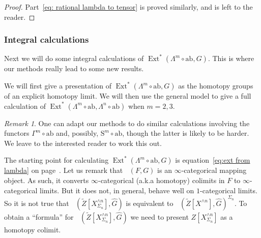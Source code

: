 \documentclass[psamsfonts]{amsart}
\theoremstyle{plain}
\theoremstyle{definition}
\theoremstyle{remark}
\newtheorem{rem}[thm]{Remark}
\newcommand{\abelianization}{\mathrm{ab}}
\newcommand{\symm}{\mathrm{S}}
\DeclareMathOperator{\ext}{Ext}
\DeclareMathOperator{\nat}{Nat}
\DeclareMathOperator{\spectralNat}{\underline{\underline{\nat}}}
\begin{document}
\begin{proof}
Part~\eqref{eq: rational lambda to tensor} is proved similarly, and is left to the reader.
\end{proof}
\subsubsection*{Integral calculations} Next we will do some integral calculations of $\ext^*(\Lambda^m \circ \abelianization, G)$. This is where our methods really lead to some new results. 

We will first give a presentation of $\ext^*(\Lambda^m \circ \abelianization, G)$ as the homotopy groups of an explicit homotopy limit. We will then use the general model to give a full calculation of $\ext^*(\Lambda^m \circ \abelianization, \Lambda^n\circ \abelianization)$ when $m=2,3$.  
\begin{rem}
One can adapt our methods to do similar calculations involving the functors $\Gamma^m\circ \abelianization$ and, possibly, $\symm^m\circ \abelianization$, though the latter is likely to be harder. We leave to the interested reader to work this out.
\end{rem}
The starting point for calculating $\ext^*(\Lambda^m \circ \abelianization, G)$ is equation~\eqref{eq:ext from lambda} on page~\pageref{eq:ext from lambda}. Let us remark that $\spectralNat(F, G)$ is an $\infty$-categorical mapping object. As such, it converts $\infty$-categorical (a.k.a homotopy) colimits in $F$ to $\infty$-categorical limits. But it does not, in general, behave well on $1$-categorical limits. So it is not true that $\spectralNat(\widetilde Z[X^{\wedge n}_{\Sigma_n}], \widehat G)$ is equivalent to $\spectralNat(\widetilde Z[X^{\wedge n}], \widehat G)^{\Sigma_n}$. To obtain a ``formula'' for $\spectralNat(\widetilde Z[X^{\wedge n}_{\Sigma_n}], \widehat G)$ we need to present $Z[X^{\wedge n}_{\Sigma_n}]$ as a homotopy colimit. 
\end{document}
